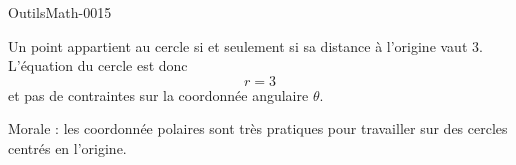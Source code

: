 
\begin{corrige}{OutilsMath-0015}

	Un point appartient au cercle si et seulement si sa distance à l'origine vaut $3$. L'équation du cercle est donc
	\begin{equation}
		r=3
	\end{equation}
	et pas de contraintes sur la coordonnée angulaire $\theta$.

	Morale : les coordonnée polaires sont très pratiques pour travailler sur des cercles centrés en l'origine.

\end{corrige}
